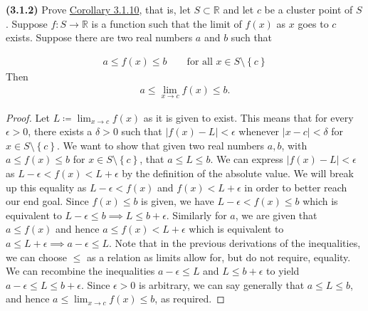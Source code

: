 \documentclass[12pt]{article}
\newcommand{\set}[1]{\left\{ {#1} \right\}}
\newcommand{\limit}[1]{\displaystyle \lim_{ {#1} }}
\newcommand{\abs}[1]{\left| {#1} \right|}
\newcommand{\bR}{\mathbb{R}}
\begin{document}
\newpage

\noindent \textbf{(3.1.2)} Prove \underline{Corollary 3.1.10}, that is, let $S\subset\bR$ and let $c$ be a cluster point of $S$. Suppose $f:S\to\bR$ is a function such that the limit of $f(x)$ as $x$ goes to $c$ exists. Suppose there are two real numbers $a$ and $b$ such that

\begin{align*}
	a\le f(x)\le b \qquad \text{for all }x\in S\setminus\set{c}
\end{align*}
\noindent Then
\begin{align*}
	a\le\limit{x\to c}f(x)\le b.
\end{align*}

\begin{proof}
	Let $L\coloneq \limit{x\to c}f(x)$ as it is given to exist. This means that for every $\epsilon>0$, there exists a $\delta>0$ such that $\abs{f(x)-L}<\epsilon$ whenever $\abs{x-c}<\delta$ for $x\in S\setminus\set{c}$. We want to show that given two real numbers $a,b$, with $a\le f(x)\le b$ for $x\in S\setminus\set{c}$, that $a\le L\le b$. We can express $\abs{f(x)-L}<\epsilon$ as $L-\epsilon<f(x)<L+\epsilon$ by the definition of the absolute value. We will break up this equality as $L-\epsilon<f(x)$ and $f(x)<L+\epsilon$ in order to better reach our end goal. Since $f(x)\le b$ is given, we have $L-\epsilon< f(x)\le b$ which is equivalent to $L-\epsilon\le b\implies L\le b+\epsilon$. Similarly for $a$, we are given that $a\le f(x)$ and hence $a\le f(x)<L+\epsilon$ which is equivalent to $a\le L+\epsilon\implies a-\epsilon\le L$. Note that in the previous derivations of the inequalities, we can choose $\le$ as a relation as limits allow for, but do not require, equality. We can recombine the inequalities $a-\epsilon\le L$ and $L\le b+\epsilon$ to yield $a-\epsilon\le L\le b+\epsilon$. Since $\epsilon>0$ is arbitrary, we can say generally that $a\le L\le b$, and hence $a\le\limit{x\to c}f(x)\le b$, as required.
\end{proof}
\end{document}
